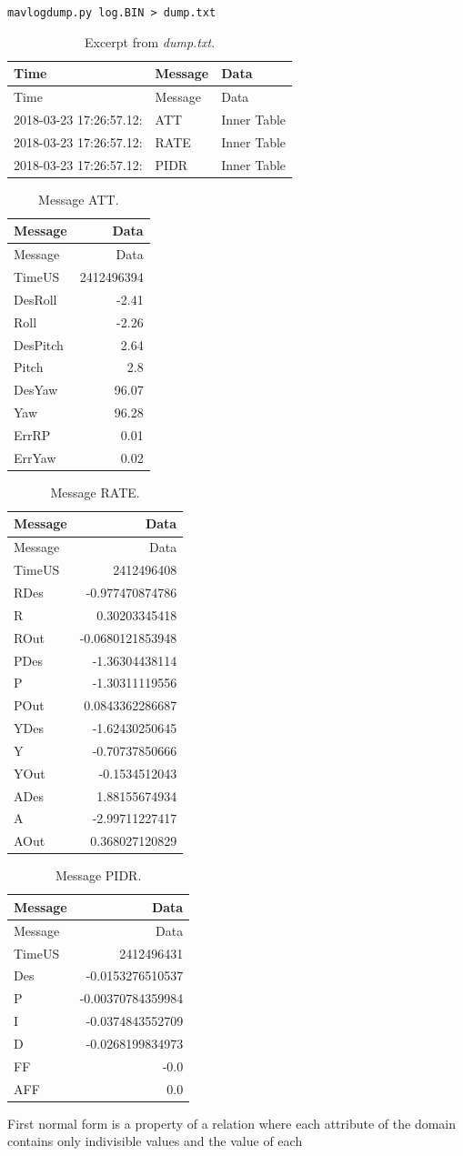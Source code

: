 \documentclass[12pt,oneside]{reedthesis}
\theoremstyle{definition}
\theoremstyle{definition}
\theoremstyle{definition}
\theoremstyle{remark}
\begin{document}
\texttt{mavlogdump.py\ log.BIN\ \textgreater{}\ dump.txt}
\begin{longtable}[]{@{}lll@{}}
\caption{\label{tab:dump} Excerpt from \emph{dump.txt}.}\tabularnewline
\toprule
Time & Message & Data\tabularnewline
\midrule
\endfirsthead
\toprule
Time & Message & Data\tabularnewline
\midrule
\endhead
2018-03-23 17:26:57.12: & ATT & Inner Table\tabularnewline
2018-03-23 17:26:57.12: & RATE & Inner Table\tabularnewline
2018-03-23 17:26:57.12: & PIDR & Inner Table\tabularnewline
\bottomrule
\end{longtable}
\begin{longtable}[]{@{}lr@{}}
\caption{\label{tab:att} Message ATT.}\tabularnewline
\toprule
Message & Data\tabularnewline
\midrule
\endfirsthead
\toprule
Message & Data\tabularnewline
\midrule
\endhead
TimeUS & 2412496394\tabularnewline
DesRoll & -2.41\tabularnewline
Roll & -2.26\tabularnewline
DesPitch & 2.64\tabularnewline
Pitch & 2.8\tabularnewline
DesYaw & 96.07\tabularnewline
Yaw & 96.28\tabularnewline
ErrRP & 0.01\tabularnewline
ErrYaw & 0.02\tabularnewline
\bottomrule
\end{longtable}
\begin{longtable}[]{@{}lr@{}}
\caption{\label{tab:rate} Message RATE.}\tabularnewline
\toprule
Message & Data\tabularnewline
\midrule
\endfirsthead
\toprule
Message & Data\tabularnewline
\midrule
\endhead
TimeUS & 2412496408\tabularnewline
RDes & -0.977470874786\tabularnewline
R & 0.30203345418\tabularnewline
ROut & -0.0680121853948\tabularnewline
PDes & -1.36304438114\tabularnewline
P & -1.30311119556\tabularnewline
POut & 0.0843362286687\tabularnewline
YDes & -1.62430250645\tabularnewline
Y & -0.70737850666\tabularnewline
YOut & -0.1534512043\tabularnewline
ADes & 1.88155674934\tabularnewline
A & -2.99711227417\tabularnewline
AOut & 0.368027120829\tabularnewline
\bottomrule
\end{longtable}
\begin{longtable}[]{@{}lr@{}}
\caption{\label{tab:pidr} Message PIDR.}\tabularnewline
\toprule
Message & Data\tabularnewline
\midrule
\endfirsthead
\toprule
Message & Data\tabularnewline
\midrule
\endhead
TimeUS & 2412496431\tabularnewline
Des & -0.0153276510537\tabularnewline
P & -0.00370784359984\tabularnewline
I & -0.0374843552709\tabularnewline
D & -0.0268199834973\tabularnewline
FF & -0.0\tabularnewline
AFF & 0.0\tabularnewline
\bottomrule
\end{longtable}
First normal form is a property of a relation where each attribute of
the domain contains only indivisible values and the value of each
\end{document}
